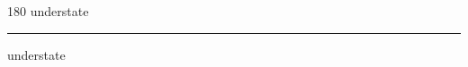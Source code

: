 
\begin{frame}
\begin{center}
\begin{turn}{180}
{\fontsize{2.5cm}{1em}\selectfont understate}
\end{turn}
\vspace{1em}\par  
\hrule
\vspace{1em}\par  
{\fontsize{2.5cm}{1em}\selectfont understate}
\end{center}
\end{frame}
